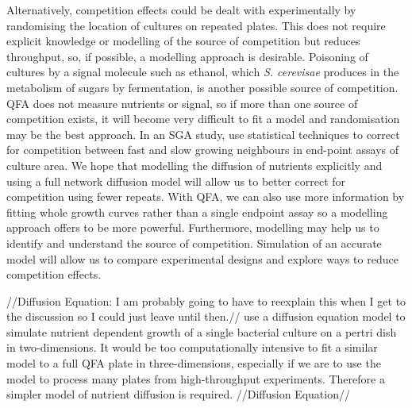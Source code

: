 Alternatively, competition effects could be dealt with experimentally
by randomising the location of cultures on repeated plates. This does
not require explicit knowledge or modelling of the source of
competition but reduces throughput, so, if possible, a modelling
approach is desirable. Poisoning of cultures by a signal molecule such
as ethanol, which \textit{S. cerevisae} produces in the metabolism of
sugars by fermentation, is another possible source of competition. QFA
does not measure nutrients or signal, so if more than one source of
competition exists, it will become very difficult to fit a model and
randomisation may be the best approach.  In an SGA study,
\citet{Baryshnikova2010} use statistical techniques to correct for
competition between fast and slow growing neighbours in end-point
assays of culture area. We hope that modelling the diffusion of
nutrients explicitly and using a full network diffusion model will
allow us to better correct for competition using fewer repeats. With
QFA, we can also use more information by fitting whole growth curves
rather than a single endpoint assay so a modelling approach offers to
be more powerful. Furthermore, modelling may help us to identify and
understand the source of competition. Simulation of an accurate model
will allow us to compare experimental designs and explore ways to
reduce competition effects.

//Diffusion Equation: I am probably going to have to reexplain this
when I get to the discussion so I could just leave until then.//
\citep{Reo2014} use a diffusion equation model to simulate nutrient
dependent growth of a single bacterial culture on a pertri dish in
two-dimensions. It would be too computationally intensive to fit a
similar model to a full QFA plate in three-dimensions, especially if
we are to use the model to process many plates from high-throughput
experiments. Therefore a simpler model of nutrient diffusion is
required.
//Diffusion Equation//


